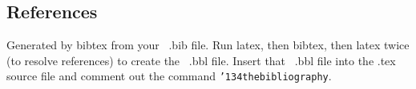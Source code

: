 \documentclass{acm_proc_article-sp}
\begin{document}
\subsection{References}
Generated by bibtex from your ~.bib file.  Run latex,
then bibtex, then latex twice (to resolve references)
to create the ~.bbl file.  Insert that ~.bbl file into
the .tex source file and comment out
the command \texttt{{\char'134}thebibliography}.
\end{document}
